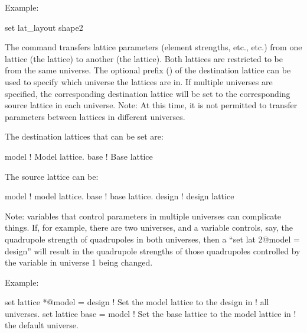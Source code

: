 {{\begin{description}
Example:
\begin{example}
  set lat_layout shape2%
\end{example}


\item[set lattice \{n@\}<destination\_lat> = <source\_lat>] \Newline

\vskip -0.2in

The  command transfers lattice parameters (element
strengths, etc., etc.) from one lattice (the  lattice) to
another (the  lattice). Both lattices are restricted
to be from the same universe. The optional  prefix
() of the destination lattice can be used to specify
which universe the lattices are in. If multiple universes are
specified, the corresponding destination lattice will be set to the
corresponding source lattice in each universe. Note: At this time, it
is not permitted to transfer parameters between lattices in different
universes.

The destination lattices that can be set are:
\begin{example}
  model      ! Model lattice.
  base       ! Base lattice
\end{example}
The source lattice can be:
\begin{example}
  model       ! model lattice.
  base        ! base lattice.
  design      ! design lattice
\end{example}

Note: \tao variables that control parameters in multiple universes can
complicate things. If, for example, there are two universes, and a
\tao variable controls, say, the quadrupole strength of quadrupoles in
both universes, then a ``set lat 2@model = design'' will result in the
quadrupole strengths of those quadrupoles controlled by the variable
in universe 1 being changed.

Example:
\begin{example}
  set lattice *@model = design  ! Set the model lattice to the design in 
                                !   all universes.
  set lattice base = model      ! Set the base lattice to the model lattice in 
                                !   the default universe.
\end{example}



\end{description}}}
